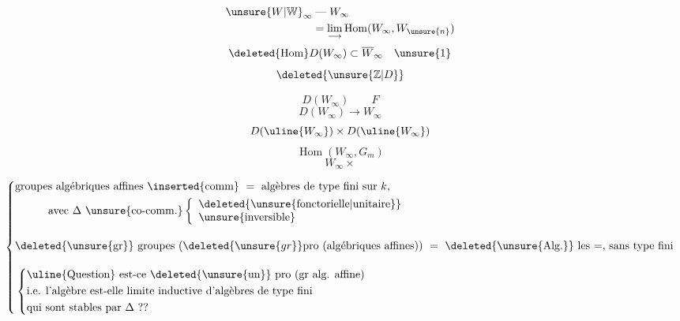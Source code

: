 
\[\begin{aligned}
\unsure{W|\mathbb W}_\infty&\;\text{---}\; W_\infty\\
&=\lim_{\longrightarrow}\operatorname{Hom}(W_\infty,W_{\unsure{n}})
\end{aligned}\]
\[\deleted{\operatorname{Hom}}D(W_\infty)\subset\overline W_\infty\quad\unsure{1}\]
\[\deleted{\unsure{\mathbb Z|D}}\]

\[D(W_\infty)\qquad F\]
\[D(W_\infty)\longrightarrow W_\infty\]
\[D(\uline{W_\infty})\times D(\uline{W_\infty})\]
\[\operatorname{Hom}(W_\infty,G_m)\]
\[W_\infty\times\]

\[
\left\{\begin{aligned}
&\text{groupes algébriques affines \inserted{comm}}\ =\
\text{algèbres de type fini sur $k$,}\\
&\hspace{3em}\text{avec $\Delta$ \unsure{co-comm.}}
\left\{\begin{array}{l}\text{\deleted{\unsure{fonctorielle|unitaire}}}\\\text{\unsure{inversible}}\end{array}\right.\\[1em]
&\text{\deleted{\unsure{gr}} groupes ($\deleted{\unsure{gr}}\mathrm{pro}$ (algébriques affines))}\ =\
\text{\deleted{\unsure{Alg.}} les $=$, sans type fini}\\[1em]
&\left\{\begin{aligned}
&\text{\uline{Question} est-ce \deleted{\unsure{un}} pro (gr alg. affine)}\\
&\text{i.e. l'algèbre est-elle limite inductive d'algèbres de type fini}\\
&\text{qui sont stables par $\Delta$ ??}
\end{aligned}\right.
\end{aligned}\right.
\]
